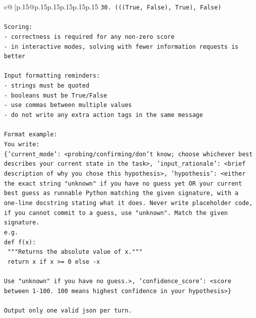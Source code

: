 \documentclass{article}
\begin{document}
{\begin{supertabular}{c@{$\;$}|p{.15\linewidth}@{}p{.15\linewidth}p{.15\linewidth}p{.15\linewidth}p{.15\linewidth}p{.15\linewidth}}
{{{\texttt{30. (((True, False), True), False)} \\
\\ 
\texttt{Scoring:} \\
\texttt{{-} correctness is required for any non{-}zero score} \\
\texttt{{-} in interactive modes, solving with fewer information requests is better} \\
\\ 
\texttt{Input formatting reminders:} \\
\texttt{{-} strings must be quoted} \\
\texttt{{-} booleans must be True/False} \\
\texttt{{-} use commas between multiple values} \\
\texttt{{-} do not write any extra action tags in the same message} \\
\\ 
\texttt{Format example:} \\
\texttt{You write:} \\
\texttt{\{'current\_mode': <probing/confirming/don't know; choose whichever best describes your current state in the task>, 'input\_rationale': <brief description of why you chose this hypothesis>, 'hypothesis': <either the exact string "unknown" if you have no guess yet OR your current best guess as runnable Python matching the given signature, with a one{-}line docstring stating what it does. Never write placeholder code, if you cannot commit to a guess, use "unknown". Match the given signature.} \\
\texttt{e.g.} \\
\texttt{def f(x):} \\
\texttt{	"""Returns the absolute value of x."""} \\
\texttt{	return x if x >= 0 else {-}x} \\
\\ 
\texttt{Use "unknown" if you have no guess.>, 'confidence\_score': <score between 1{-}100. 100 means highest confidence in your hypothesis>\}} \\
\\ 
\texttt{Output only one valid json per turn.} \\
            }
        }
    }
     \\ \\


\end{supertabular}}
\end{document}
